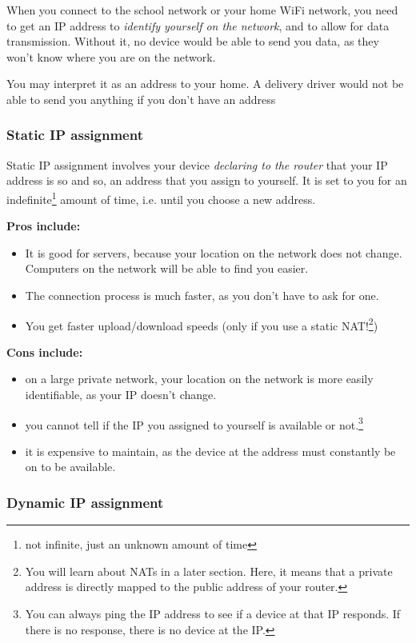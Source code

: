 \documentclass[../main.tex]{subfiles}
\begin{document}
When you connect to the school network or your home WiFi network, you need to get an IP address to \emph{identify yourself on the network}, and to allow for data transmission. Without it, no device would be able to send you data, as they won't know where you are on the network.

You may interpret it as an address to your home. A delivery driver would not be able to send you anything if you don't have an address

\subsubsection{Static IP assignment}

Static IP assignment involves your device \emph{declaring to the router} that your IP address is so and so, an address that you assign to yourself. It is set to you for an indefinite\footnote{not infinite, just an unknown amount of time} amount of time, i.e. until you choose a new address.

\textbf{Pros include:}
\begin{itemize}
    \item It is good for servers, because your location on the network does not change. Computers on the network will be able to find you easier.
    \item The connection process is much faster, as you don't have to ask for one.
    \item You get faster upload/download speeds (only if you use a static NAT!\footnote{You will learn about NATs in a later section. Here, it means that a private address is directly mapped to the public address of your router.})
\end{itemize}

\textbf{Cons include:}
\begin{itemize}
    \item on a large private network, your location on the network is more easily identifiable, as your IP doesn't change.
    \item you cannot tell if the IP you assigned to yourself is available or not.\footnote{You can always ping the IP address to see if a device at that IP responds. If there is no response, there is no device at the IP.}
    \item it is expensive to maintain, as the device at the address must constantly be on to be available.
\end{itemize}

\subsubsection{Dynamic IP assignment}
\end{document}
